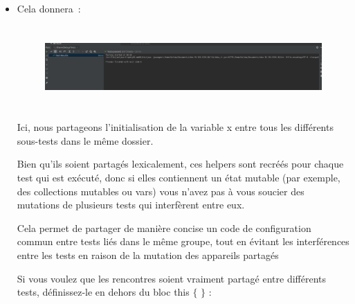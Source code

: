 \documentclass[12pt]{article}
\begin{document}
\begin{itemize}
	\item Cela donnera :\par




\begin{figure}[H]
	\begin{Center}
		\includegraphics[width=6.78in,height=1.24in]{./media/image10.png}
	\end{Center}
\end{figure}



\par

\begin{justify}
Ici, nous partageons l’initialisation de la variable x entre tous les différents sous-tests dans le même dossier.
\end{justify}\par

\begin{justify}
Bien qu’ils soient partagés lexicalement, ces helpers sont recréés pour chaque test qui est exécuté, donc si elles contiennent un état mutable (par exemple, des collections mutables ou vars) vous n'avez pas à vous soucier des mutations de plusieurs tests qui interfèrent entre eux.
\end{justify}\par

\begin{justify}
Cela permet de partager de manière concise un code de configuration commun entre tests liés dans le même groupe, tout en évitant les interférences entre les tests en raison de la mutation des appareils partagés
\end{justify}\par

\begin{justify}
Si vous voulez que les rencontres soient vraiment partagé entre différents tests, définissez-le en dehors du bloc this $ \{ $ $ \} $ :
\end{justify}\par




\end{itemize}
\end{document}
